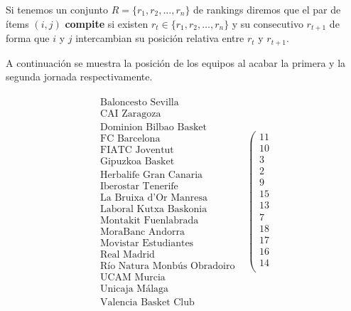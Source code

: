 \begin{defi} Si tenemos un conjunto $R=\{r_{1},r_{2},\dots,r_{n}\}$ de rankings diremos que el par de ítems $(i,j)$ \textbf{compite} si existen $r_{t} \in \{r_{1},r_{2},\dots,r_{n}\}$ y su consecutivo $r_{t+1}$ de forma que $i$ y $j$ intercambian su posición relativa entre $r_{t}$ y $r_{t+1}$.
\end{defi}

\begin{ejem} A continuación se muestra la posición de los equipos al acabar la primera y la segunda jornada respectivamente.
\end{ejem}
\[
\begin{array}{ccc} 
\begin{array}{c}
\text{Baloncesto Sevilla}\\
\text{CAI Zaragoza} \\
\text{Dominion Bilbao Basket} \\
\text{FC Barcelona} \\
\text{FIATC Joventut} \\
\text{Gipuzkoa Basket} \\
\text{Herbalife Gran Canaria} \\
\text{Iberostar Tenerife} \\
\text{La Bruixa d'Or Manresa} \\
\text{Laboral Kutxa Baskonia} \\
\text{Montakit Fuenlabrada} \\
\text{MoraBanc Andorra} \\
\text{Movistar Estudiantes} \\
\text{Real Madrid} \\
\text{Río Natura Monbús Obradoiro} \\
\text{UCAM Murcia} \\
\text{Unicaja Málaga} \\
\text{Valencia Basket Club}
\end{array} & \left(\begin{array}{c}
11\\
10\\
3\\
2\\
9\\
15\\
13\\
7\\
18\\
17\\
16\\
14\\

\end{array}
\end{array}\]
